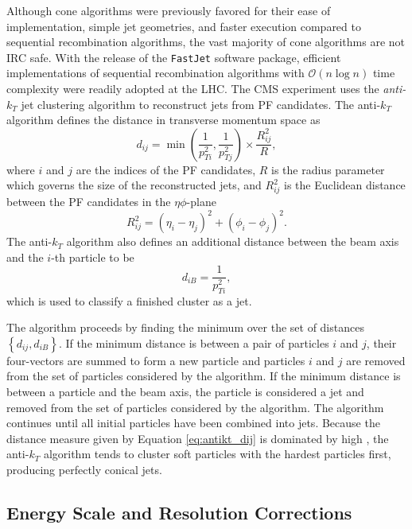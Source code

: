 Although cone algorithms were previously favored for their ease of implementation, simple jet geometries, and faster execution compared to sequential recombination algorithms, the vast majority of cone algorithms are not IRC safe. With the release of the \texttt{FastJet}\cite{FASTJET} software package, efficient implementations of sequential recombination algorithms with $\mathcal{O}(n \log n)$ time complexity were readily adopted at the LHC. The CMS experiment uses the \textit{anti-$k_{T}$} jet clustering algorithm\cite{ANTIKT} to reconstruct jets from PF candidates. The anti-$k_{T}$ algorithm defines the distance in transverse momentum space as
\begin{equation}
  d_{ij} = \min \left( \frac{1}{p_{Ti}^{2}}, \frac{1}{p_{Tj}^{2}} \right) \times \frac{R_{ij}^{2}}{R},
  \label{eq:antikt_dij}
\end{equation}
where $i$ and $j$ are the indices of the PF candidates, $R$ is the radius parameter which governs the size of the reconstructed jets, and $R_{ij}^{2}$ is the Euclidean distance between the PF candidates in the $\eta\phi$-plane
\begin{equation}
  R_{ij}^{2} = \left( \eta_{i} - \eta_{j} \right)^{2} + \left( \phi_{i} - \phi_{j} \right)^{2}.
  \label{eq:deltaR2}
\end{equation}
The anti-$k_{T}$ algorithm also defines an additional distance between the beam axis and the $i$-th particle to be
\begin{equation}
  d_{iB} = \frac{1}{p_{Ti}^{2}},
  \label{eq:antikt_diB}
\end{equation}
which is used to classify a finished cluster as a jet.

The algorithm proceeds by finding the minimum over the set of distances $\left\{ d_{ij}, d_{iB} \right\}$. If the minimum distance is between a pair of particles $i$ and $j$, their four-vectors are summed to form a new particle and particles $i$ and $j$ are removed from the set of particles considered by the algorithm. If the minimum distance is between a particle and the beam axis, the particle is considered a jet and removed from the set of particles considered by the algorithm. The algorithm continues until all initial particles have been combined into jets. Because the distance measure given by Equation \ref{eq:antikt_dij} is dominated by high \pT, the anti-$k_{T}$ algorithm tends to cluster soft particles with the hardest particles first, producing perfectly conical jets.

\subsection{Energy Scale and Resolution Corrections} \label{jesjer}

